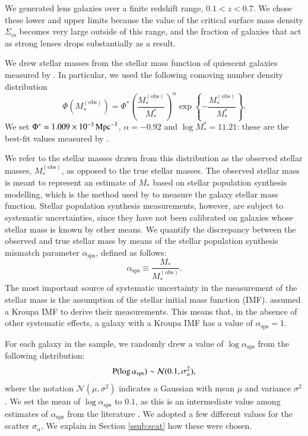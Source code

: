 \documentclass{aa}
\def\mstar{M_*}
\def\asps{\alpha_{\mathrm{sps}}}
\def\mobs{M_*^{(\mathrm{obs})}}
\def\pr{{\rm P}}
\begin{document}
We generated lens galaxies over a finite redshift range, $0.1 < z < 0.7$.
We chose these lower and upper limits because the value of the critical surface mass density $\Sigma_{\mathrm{cs}}$ becomes very large outside of this range, and the fraction of galaxies that act as strong lenses drops substantially as a result.

We drew stellar masses from the stellar mass function of quiescent galaxies measured by \citet{Muz++13}.
In particular, we used the following comoving number density distribution
\begin{equation}
\Phi(\mobs) = \Phi^*\left(\frac{\mobs}{\mstar^*}\right)^{\alpha} \exp{\left\{-\frac{\mobs}{\mstar^*}\right\}}.
\end{equation}
We set $\Phi^*=1.009\times10^{-3}\,{\rm Mpc}^{-3}$, $\alpha=-0.92$ and $\log{\mstar^*}=11.21$: these are the best-fit values measured by \citet{Muz++13}.

We refer to the stellar masses drawn from this distribution as the observed stellar masses, $\mobs$, as opposed to the true stellar masses.
The observed stellar mass is meant to represent an estimate of $\mstar$ based on stellar population synthesis modelling, which is the method used by \citet{Muz++13} to measure the galaxy stellar mass function.
Stellar population synthesis measurements, however, are subject to systematic uncertainties, since they have not been calibrated on galaxies whose stellar mass is known by other means.
We quantify the discrepancy between the observed and true stellar mass by means of the stellar population synthesis mismatch parameter $\asps$, defined as follows:
\begin{equation}
\asps \equiv \frac{\mstar}{\mobs}.
\end{equation}
The most important source of systematic uncertainty in the measurement of the stellar mass is the assumption of the stellar initial mass function (IMF). \citet{Muz++13} assumed a Kroupa IMF \citep{Kro01} to derive their measurements. This means that, in the absence of other systematic effects, a galaxy with a Kroupa IMF has a value of $\asps=1$.

For each galaxy in the sample, we randomly drew a value of $\log{\asps}$ from the following distribution:
\begin{equation}
\pr(\log{\asps}) \sim \mathcal{N}(0.1, \sigma_\alpha^2),
\end{equation}
where the notation $\mathcal{N}(\mu,\sigma^2)$ indicates a Gaussian with mean $\mu$ and variance $\sigma^2$.
We set the mean of $\log{\asps}$ to $0.1$, as this is an intermediate value among estimates of $\asps$ from the literature \citep{CvD12, Cap++13, SLC15, Son++15, Son++19}.
We adopted a few different values for the scatter $\sigma_\alpha$. We explain in Section \ref{ssub:scat} how these were chosen.
\end{document}
